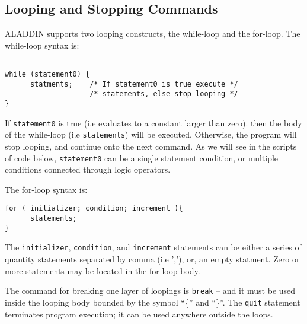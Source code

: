 \subsection{Looping and Stopping Commands}

\vspace{0.15 in}
\noindent\hspace{0.5 in}
ALADDIN supports two looping constructs, the while-loop and the for-loop.
The while-loop syntax is:

\begin{footnotesize}
\begin{verbatim}

while (statement0) {
      statments;    /* If statement0 is true execute */
                    /* statements, else stop looping */
}
\end{verbatim}
\end{footnotesize}

\vspace{0.15 in}\noindent
If {\tt statement0} is true (i.e evaluates to a constant larger than zero).
then the body of the while-loop (i.e {\tt statements}) will be executed.
Otherwise, the program will stop looping,
and continue onto the next command.
As we will see in the scripts of code below,
{\tt statement0} can be a single statement condition,
or multiple conditions connected through logic operators.

\vspace{0.15 in}\noindent
The for-loop syntax is:

\begin{footnotesize}
\begin{verbatim}
for ( initializer; condition; increment ){
      statements;
}
\end{verbatim}
\end{footnotesize}

\vspace{0.15 in}\noindent
The {\tt initializer}, {\tt condition}, and {\tt increment}
statements can be either a series of quantity statements
separated by comma (i.e ','), or, an empty statment.
Zero or more statements may be located in the for-loop body.

\vspace{0.15 in}
\noindent\hspace{0.50 in}
The command for breaking one layer of loopings is {\tt break} --
and it must be used inside the looping
body bounded by the symbol ``\{'' and ``\}''.
The {\tt quit} statement terminates program execution;
it can be used anywhere outside the loops.

